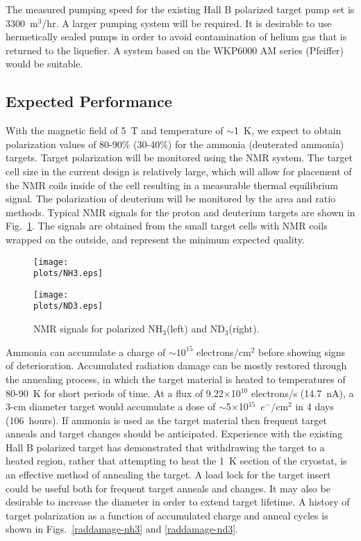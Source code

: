 The measured pumping speed for the existing Hall B polarized target pump set 
is 3300~m$^3$/hr.  A larger pumping system will be required.  It is desirable 
to use hermetically sealed pumps in order to avoid contamination of helium 
gas that is returned to the liquefier. A system based on the WKP6000 AM 
series (Pfeiffer) would be suitable.

\subsection{Expected Performance}

With the magnetic field of 5~T and temperature of $\sim$1~K, we expect 
to obtain polarization values of 80-90\% (30-40\%) for the ammonia 
(deuterated ammonia) targets.  Target polarization will be monitored 
using the NMR system.  The target cell size in the current design is 
relatively large, which will allow for placement of the NMR coils inside 
of the cell resulting in a measurable thermal equilibrium signal. The 
polarization of deuterium will be monitored by the area and ratio methods.
Typical NMR signals for the proton and deuterium targets are shown in 
Fig.~\ref{nmr}.  The signals are obtained from the small target cells 
with NMR coils wrapped on the outside, and represent the minimum expected 
quality.

\begin{figure}
\centering
\begin{minipage}[t]{0.5\linewidth}
\centering
\texttt{[image: \\plots/NH3.eps]} 
\end{minipage}%
\begin{minipage}[t]{0.5\linewidth}
\centering
\texttt{[image: \\plots/ND3.eps]} 
\end{minipage}
\caption{\small{NMR signals for polarized NH$_3$(left) and ND$_3$(right).}}
\label{nmr}
\end{figure}

Ammonia can accumulate a charge of $\sim 10^{15}$ electrons/cm$^2$ before 
showing signs of deterioration.  Accumulated radiation damage can be mostly 
restored through the annealing process, in which the target material is 
heated to temperatures of 80-90~K for short periods of time.  At a flux of 
9.22$\times$10$^{10}$ electrons/s (14.7~nA), a 3-cm diameter target would 
accumulate a dose of $\sim$5$\times$10$^{15}$~$e^-$/cm$^2$ in 4 days 
(106~hours).  If ammonia is used as the target material then frequent target 
anneals and target changes should be anticipated.  Experience with the 
existing Hall B polarized target has demonstrated that withdrawing the 
target to a heated region, rather that attempting to heat the 1~K section 
of the cryostat, is an effective method of annealing the target.  A load 
lock for the target insert could be useful both for frequent target 
anneals and changes.  It may also be desirable to increase the diameter 
in order to extend target lifetime.  A history of target polarization as 
a function of accumulated charge and anneal cycles is shown in 
Figs.~\ref{raddamage-nh3} and \ref{raddamage-nd3}.

